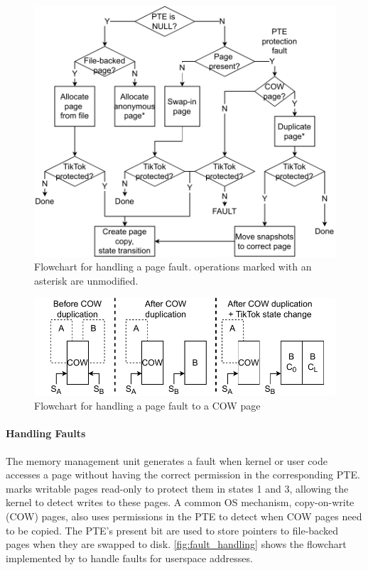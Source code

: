 \documentclass[letterpaper,twocolumn,10pt, anonymous]{article}
\begin{document}
\begin{figure}[]
  \includegraphics[width=\linewidth]{img/pagefault.pdf}
  \caption{Flowchart for handling a page fault. operations
           marked with an asterisk are unmodified.}
  \label{fig:fault_handling}
\end{figure}

\begin{figure}[]
  \includegraphics[width=\linewidth]{img/pagefault_cow.pdf}
  \caption{Flowchart for handling a page fault to a COW page}
  \label{fig:fault_handling_cow}
\end{figure}

\paragraph{Handling Faults}
The memory management unit generates a fault when kernel or user code accesses
a page without having the correct permission in the corresponding PTE.
\tiktok marks writable pages read-only to protect them in 
states 1 and 3, allowing the kernel to detect writes to these pages.
A common OS mechanism, copy-on-write (COW) pages, also uses 
permissions in the PTE to detect when COW pages need to be copied.
The PTE's present bit are used to store pointers to file-backed pages
when they are swapped to disk.
\autoref{fig:fault_handling} shows the flowchart implemented by
 to handle faults for userspace addresses.
\end{document}

